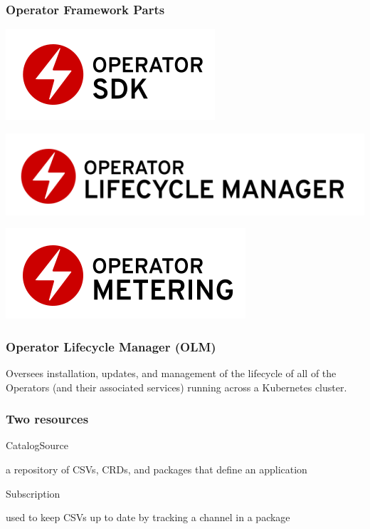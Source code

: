 \documentclass[aspectratio=169]{beamer}
\begin{document}
\begin{frame}
  \frametitle{Operator Framework Parts}

  \includegraphics[scale=.50]{images/operator_logo_sdk_color.png}

  \includegraphics[scale=.50]{images/operator_logo_lifecycle_manager_color.png}

  \includegraphics[scale=.50]{images/operator_logo_metering_color.png}

\end{frame}

\begin{frame}
  \frametitle{Operator Lifecycle Manager (OLM)}

  Oversees installation, updates, and management of the lifecycle of
  all of the Operators (and their associated services) running across
  a Kubernetes cluster.

\end{frame}

\begin{frame}

  \frametitle{Two resources}

CatalogSource

a repository of CSVs, CRDs, and packages that define an application

Subscription

used to keep CSVs up to date by tracking a channel in a package

\end{frame}
\end{document}
